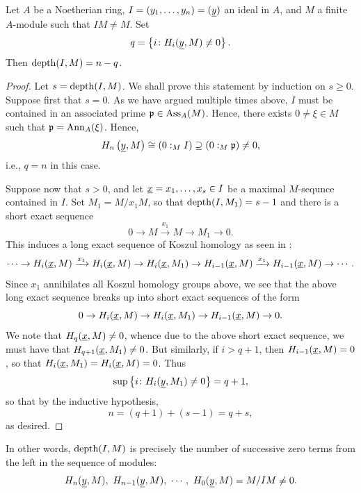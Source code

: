 \begin{theorem}
    Let $A$ be a Noetherian ring, $I = (y_1,\dots,y_n) = (\underline{y})$ an ideal in $A$, and $M$ a finite $A$-module such that $IM\ne M$. Set 
    \begin{equation*}
        q = \left\{i\colon H_i(\underline{y}, M)\ne 0\right\}.
    \end{equation*}
    Then $\operatorname{depth}(I, M) = n - q$.
\end{theorem}
\begin{proof}
    Let $s = \operatorname{depth}(I, M)$. We shall prove this statement by induction on $s\ge 0$. Suppose first that $s = 0$. As we have argued multiple times above, $I$ must be contained in an associated prime $\mathfrak{p}\in\operatorname{Ass}_A(M)$. Hence, there exists $0\ne\xi\in M$ such that $\mathfrak{p} = \operatorname{Ann}_A(\xi)$. Hence, 
    \begin{equation*}
        H_n\left(\underline{y}, M\right) \cong (0 :_M I)\supseteq(0 :_M \mathfrak{p})\ne 0,
    \end{equation*}
    i.e., $q = n$ in this case.

    Suppose now that $s > 0$, and let $\underline{x} = x_1,\dots,x_s\in I$ be a maximal $M$-sequnce contained in $I$. Set $M_1 = M/x_1 M$, so that $\operatorname{depth}(I, M_1) = s - 1$ and there is a short exact sequence 
    \begin{equation*}
        0\to M\xrightarrow{x_1} M\to M_1\to 0.
    \end{equation*}
    This induces a long exact sequence of Koszul homology as seen in : 
    \begin{equation*}
        \cdots\to H_i(\underline{x}, M)\xrightarrow{x_1} H_i(\underline{x}, M)\to H_i(\underline{x}, M_1)\to H_{i - 1}(\underline{x}, M)\xrightarrow{x_1} H_{i - 1}(\underline{x}, M)\to\cdots.
    \end{equation*}
    Since $x_1$ annihilates all Koszul homology groups above, we see that the above long exact sequence breaks up into short exact sequences of the form 
    \begin{equation*}
        0\to H_i(\underline{x}, M)\to H_i(\underline{x}, M_1)\to H_{i - 1}(\underline{x}, M)\to 0.
    \end{equation*}
    We note that $H_q(\underline{x}, M)\ne 0$, whence due to the above short exact sequence, we must have that $H_{q + 1}(\underline{x}, M_1)\ne 0$. But similarly, if $i > q + 1$, then $H_{i - 1}(\underline{x}, M) = 0$, so that $H_i(\underline{x}, M_1) = H_i(\underline{x}, M) = 0$. Thus 
    \begin{equation*}
        \sup\left\{i\colon H_i(\underline{y}, M_1)\ne 0\right\} = q + 1,
    \end{equation*}
    so that by the inductive hypothesis, 
    \begin{equation*}
        n = (q + 1) + (s - 1) = q + s,
    \end{equation*}
    as desired.
\end{proof}

\begin{remark}
    In other words, $\operatorname{depth}(I, M)$ is precisely the number of successive zero terms from the left in the sequence of modules: 
    \begin{equation*}
        H_n(\underline{y}, M),~H_{n - 1}(\underline{y}, M),~\cdots,~H_0(\underline{y}, M) = M/IM\ne 0.
    \end{equation*}
\end{remark}
